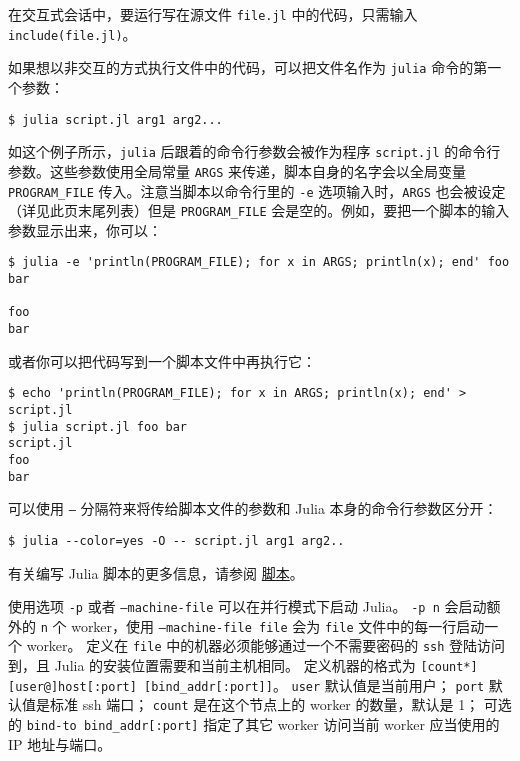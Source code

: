 在交互式会话中，要运行写在源文件 \texttt{file.jl} 中的代码，只需输入 \texttt{include({\textquotedbl}file.jl{\textquotedbl})}。



如果想以非交互的方式执行文件中的代码，可以把文件名作为 \texttt{julia} 命令的第一个参数：




\begin{lstlisting}
$ julia script.jl arg1 arg2...
\end{lstlisting}



如这个例子所示，\texttt{julia} 后跟着的命令行参数会被作为程序 \texttt{script.jl} 的命令行参数。这些参数使用全局常量 \texttt{ARGS} 来传递，脚本自身的名字会以全局变量 \texttt{PROGRAM\_FILE} 传入。注意当脚本以命令行里的 \texttt{-e} 选项输入时，\texttt{ARGS} 也会被设定（详见此页末尾列表）但是 \texttt{PROGRAM\_FILE} 会是空的。例如，要把一个脚本的输入参数显示出来，你可以：




\begin{lstlisting}
$ julia -e 'println(PROGRAM_FILE); for x in ARGS; println(x); end' foo bar

foo
bar
\end{lstlisting}



或者你可以把代码写到一个脚本文件中再执行它：




\begin{lstlisting}
$ echo 'println(PROGRAM_FILE); for x in ARGS; println(x); end' > script.jl
$ julia script.jl foo bar
script.jl
foo
bar
\end{lstlisting}



可以使用 \texttt{--} 分隔符来将传给脚本文件的参数和 Julia 本身的命令行参数区分开：




\begin{lstlisting}
$ julia --color=yes -O -- script.jl arg1 arg2..
\end{lstlisting}



有关编写 Julia 脚本的更多信息，请参阅 \hyperlink{9384335615524550131}{脚本}。



使用选项 \texttt{-p} 或者 \texttt{--machine-file} 可以在并行模式下启动 Julia。 \texttt{-p n} 会启动额外的 \texttt{n} 个 worker，使用 \texttt{--machine-file file} 会为 \texttt{file} 文件中的每一行启动一个 worker。 定义在 \texttt{file} 中的机器必须能够通过一个不需要密码的 \texttt{ssh} 登陆访问到，且 Julia 的安装位置需要和当前主机相同。 定义机器的格式为 \texttt{[count*][user@]host[:port] [bind\_addr[:port]]}。 \texttt{user} 默认值是当前用户； \texttt{port} 默认值是标准 ssh 端口； \texttt{count} 是在这个节点上的 worker 的数量，默认是 1； 可选的 \texttt{bind-to bind\_addr[:port]} 指定了其它 worker 访问当前 worker 应当使用的 IP 地址与端口。



